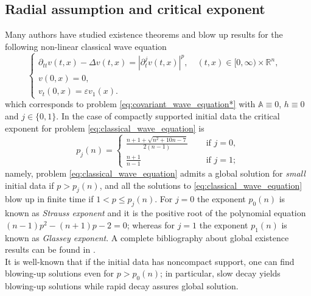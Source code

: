 \documentclass[11pt,reqno]{amsart}
\theoremstyle{definition}
\numberwithin{equation}{section}
\newcommand{\R}{\mathbb{R}}
\newcommand{\A}{\mathbb{A}}
\begin{document}
\subsection{Radial assumption and critical exponent}
Many authors have studied existence theorems and blow up results for the following non-linear classical wave equation
\begin{equation}
\label{eq:classical_wave_equation}
\begin{cases}
\partial_{tt}v(t,x)- \Delta v(t,x)=|\partial_t^jv(t,x)|^p, \quad (t,x)\in [0,\infty)\times \R^n, \\
v(0,x)=0,&\\
v_t(0,x)= \varepsilon v_1(x).&
\end{cases}
\end{equation}
%
which corresponds to problem \eqref{eq:covariant_wave_equation*} with $\A\equiv 0$, $h\equiv 0$ and $j\in \{0,1\}$. In the case of compactly supported initial data the critical exponent for problem \eqref{eq:classical_wave_equation} is 
%
\begin{equation}
p_j(n)=\begin{cases}
\frac{n+1+\sqrt{n^2+10n-7}}{2(n-1)} \quad &\text{ if } j=0,\\
\frac{n+1}{n-1} \quad & \text{ if } j=1;
\end{cases}
\end{equation}
%
namely, problem \eqref{eq:classical_wave_equation} admits a global solution for \textit{small} initial data if $p>p_j(n)$, and all the solutions to \eqref{eq:classical_wave_equation} blow up in finite time if $1<p\leq p_j(n)$.  For $j=0$ the exponent $p_0(n)$ is known as \textit{Strauss exponent} and it is the positive root of the polynomial equation $(n-1)p^2-(n+1)p-2=0$; whereas for $j=1$ the exponent $p_1(n)$ is known as \textit{Glassey exponent}. A complete bibliography about global existence results can be found in \cite{GLS1997}. \\
It is well-known that if the initial data has noncompact
support, one can find blowing-up solutions even for $p>p_0(n)$; in particular, slow decay yields blowing-up solutions while rapid
decay assures global solution.\\
\end{document}
